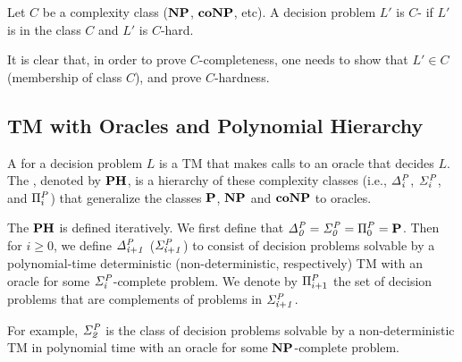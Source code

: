 
\begin{definition}
	Let $C$ be a complexity class ($\textbf{NP}$, $\textbf{coNP}$, etc).
	A decision problem $L'$ is $C$- if $L'$ is in the class 
	$C$ and $L'$ is $C$-hard.
\end{definition}
It is clear that, in order to prove $C$-completeness, one needs to show
that $L' \in C$ (membership of class $C$), and prove $C$-hardness.



\subsection{TM with Oracles and Polynomial Hierarchy}
A  for a decision problem $L$ is a TM that makes calls 
to an oracle that decides $L$.
The , denoted by $\textbf{PH}$, is a hierarchy of these
complexity classes (i.e., $\mathit{\Delta^P_{i}}$, $\mathit{\Sigma^P_{i}}$, and $\Pi^P_{i}$)
that generalize the classes $\textbf{P}$, $\textbf{NP}$ and $\textbf{coNP}$ to oracles.

\begin{definition}
	The $\textbf{PH}$ is defined iteratively.
	We first define that $\mathit{\Delta^P_{0}} = \mathit{\Sigma^P_{0}} = \Pi^P_{0} = \textbf{P}$.
	Then for $i \geq 0$, we define $\mathit{\Delta^P_{i+1}}$ ($\mathit{\Sigma^P_{i+1}}$) 
	to consist of decision problems solvable
	by a polynomial-time deterministic (non-deterministic, respectively) TM 
	with an oracle for some $\mathit{\Sigma^P_{i}}$-complete problem.
	We denote by $\Pi^P_{i+1}$ the set of decision problems that are complements
	of problems in $\mathit{\Sigma^P_{i+1}}$.
\end{definition}
For example, $\mathit{\Sigma^P_{2}}$ is the class of decision problems solvable by a non-deterministic
TM in polynomial time with an oracle for some $\textbf{NP}$-complete problem.

